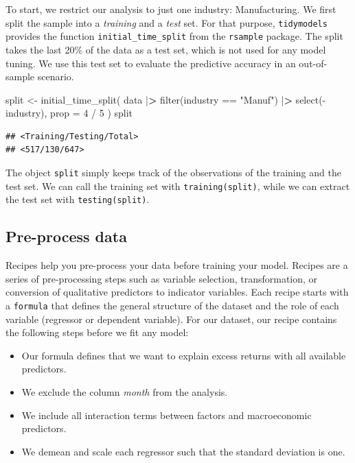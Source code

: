 \documentclass[
]{book}
\newenvironment{Shaded}{\begin{snugshade}}{\end{snugshade}}
\newcommand{\AttributeTok}[1]{\textcolor[rgb]{0.61,0.61,0.61}{#1}}
\newcommand{\DecValTok}[1]{\textcolor[rgb]{0.06,0.06,0.06}{#1}}
\newcommand{\ErrorTok}[1]{\textcolor[rgb]{0.14,0.14,0.14}{\textbf{#1}}}
\newcommand{\FunctionTok}[1]{\textcolor[rgb]{0,0,0}{#1}}
\newcommand{\NormalTok}[1]{#1}
\newcommand{\OtherTok}[1]{\textcolor[rgb]{0.37,0.37,0.37}{#1}}
\newcommand{\SpecialCharTok}[1]{\textcolor[rgb]{0,0,0}{#1}}
\newcommand{\StringTok}[1]{\textcolor[rgb]{0.5,0.5,0.5}{#1}}
\providecommand{\tightlist}{%
  \setlength{\itemsep}{0pt}\setlength{\parskip}{0pt}}
\begin{document}
To start, we restrict our analysis to just one industry: Manufacturing. We first split the sample into a \emph{training} and a \emph{test} set.
For that purpose, \texttt{tidymodels} provides the function \texttt{initial\_time\_split} from the \texttt{rsample} package.
The split takes the last 20\% of the data as a test set, which is not used for any model tuning.
We use this test set to evaluate the predictive accuracy in an out-of-sample scenario.

\begin{Shaded}
\begin{Highlighting}[]
\NormalTok{split }\OtherTok{\textless{}{-}} \FunctionTok{initial\_time\_split}\NormalTok{(}
\NormalTok{  data }\SpecialCharTok{|}\ErrorTok{\textgreater{}}
    \FunctionTok{filter}\NormalTok{(industry }\SpecialCharTok{==} \StringTok{"Manuf"}\NormalTok{) }\SpecialCharTok{|}\ErrorTok{\textgreater{}}
    \FunctionTok{select}\NormalTok{(}\SpecialCharTok{{-}}\NormalTok{industry),}
  \AttributeTok{prop =} \DecValTok{4} \SpecialCharTok{/} \DecValTok{5}
\NormalTok{)}
\NormalTok{split}
\end{Highlighting}
\end{Shaded}

\begin{verbatim}
## <Training/Testing/Total>
## <517/130/647>
\end{verbatim}

The object \texttt{split} simply keeps track of the observations of the training and the test set.
We can call the training set with \texttt{training(split)}, while we can extract the test set with \texttt{testing(split)}.

\hypertarget{pre-process-data}{%
\subsection{Pre-process data}\label{pre-process-data}}

Recipes help you pre-process your data before training your model. Recipes are a series of pre-processing steps such as variable selection, transformation, or conversion of qualitative predictors to indicator variables. Each recipe starts with a \texttt{formula} that defines the general structure of the dataset and the role of each variable (regressor or dependent variable). For our dataset, our recipe contains the following steps before we fit any model:

\begin{itemize}
\tightlist
\item
  Our formula defines that we want to explain excess returns with all available predictors.
\item
  We exclude the column \emph{month} from the analysis.
\item
  We include all interaction terms between factors and macroeconomic predictors.
\item
  We demean and scale each regressor such that the standard deviation is one.
\end{itemize}
\end{document}
